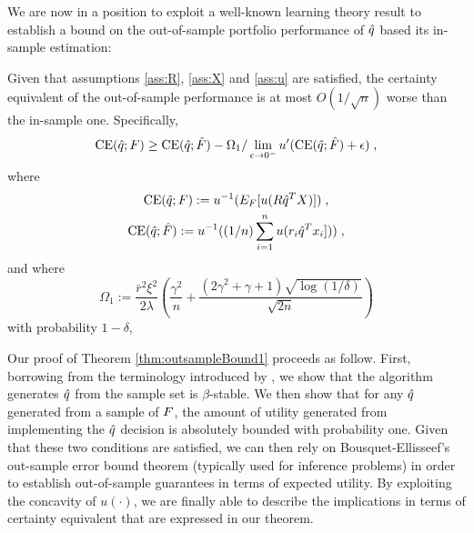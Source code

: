 
We are now in a position to exploit a well-known learning theory result to establish a
bound on the out-of-sample portfolio performance of ${\hat{q}}$ based its in-sample
estimation:
\begin{thm}\label{thm:outsampleBound1}
  Given that assumptions \ref{ass:R}, \ref{ass:X} and \ref{ass:u} are satisfied, the
  certainty equivalent of the out-of-sample performance is at most $O(1/\sqrt{n})$ worse
  than the in-sample one. Specifically,
  \[ 
    \operatorname{CE}({\hat{q}};F) \geq \operatorname{CE}({\hat{q}};{\hat{F}}) -
    \Omega_1/\lim_{\epsilon\to0^-}u'(\operatorname{CE}({\hat{q}};{\hat{F}})+\epsilon)\;,
  \]
  where
  \begin{gather*}
    \operatorname{CE}({\hat{q}};F):=u^{-1}(E_F[u(R{\hat{q}}^T X)])\;,\\
    \operatorname{CE}({\hat{q}};{\hat{F}}):=u^{-1}((1/n)\sum_{i=1}^n u(r_i {\hat{q}}^T x_i]))\;,
  \end{gather*}
and where
  \[\Omega_1 := \frac{\bar{r}^2 \xi^2}{2\lambda} \left(\frac{\gamma^2}{n} + \frac{(2\gamma^2+\gamma+1)\sqrt{\log(1/\delta)}}{\sqrt{2n}}\right)\]
  with probability $1-\delta$, 
\end{thm}

Our proof of Theorem \ref{thm:outsampleBound1} proceeds as follow. First, borrowing from
the terminology introduced by \cite{bousquet2002stability}, we show that the algorithm
generates ${\hat{q}}$ from the sample set is $\beta$-stable. We then show that for any ${\hat{q}}$
generated from a sample of $F$, the amount of utility generated from implementing the
${\hat{q}}$ decision is absolutely bounded  with
probability one. Given that these two conditions are satisfied, we can then rely on
Bousquet-Ellisseef's out-sample error bound theorem (typically used for inference
problems) in order to establish out-of-sample guarantees in terms of expected utility. By
exploiting the concavity of $u(\cdot)$, we are finally able to describe the implications
in terms of certainty equivalent that are expressed in our theorem.



